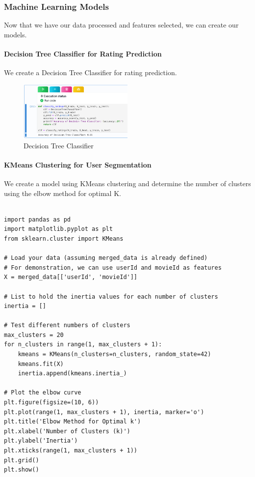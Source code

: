 \documentclass[conference]{IEEEtran}
\begin{document}
\subsubsection{Machine Learning Models}
Now that we have our data processed and features selected, we can create our models.
\paragraph{Decision Tree Classifier for Rating Prediction}
We create a Decision Tree Classifier for rating prediction.

\begin{figure}[h] %
    \centering %
    \includegraphics[width=0.5\textwidth]{DecisionClassifier.png} %
    \caption{Decision Tree Classifier}
    \label{fig: Decision Tree Classifier}
\end{figure}

\paragraph{KMeans Clustering for User Segmentation}

We create a model using KMeans clustering and determine the number of clusters using the elbow method for optimal K.
\begin{lstlisting}

import pandas as pd
import matplotlib.pyplot as plt
from sklearn.cluster import KMeans

# Load your data (assuming merged_data is already defined)
# For demonstration, we can use userId and movieId as features
X = merged_data[['userId', 'movieId']]

# List to hold the inertia values for each number of clusters
inertia = []

# Test different numbers of clusters
max_clusters = 20
for n_clusters in range(1, max_clusters + 1):
    kmeans = KMeans(n_clusters=n_clusters, random_state=42)
    kmeans.fit(X)
    inertia.append(kmeans.inertia_)

# Plot the elbow curve
plt.figure(figsize=(10, 6))
plt.plot(range(1, max_clusters + 1), inertia, marker='o')
plt.title('Elbow Method for Optimal k')
plt.xlabel('Number of Clusters (k)')
plt.ylabel('Inertia')
plt.xticks(range(1, max_clusters + 1))
plt.grid()
plt.show()
\end{lstlisting}
\end{document}
